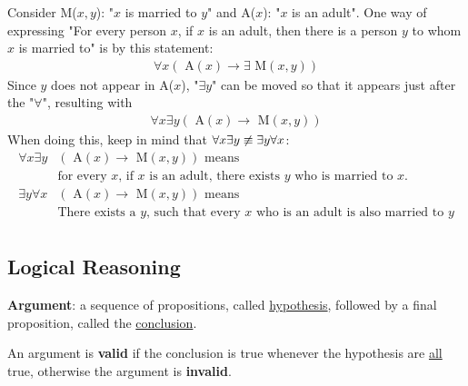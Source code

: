 \documentclass{article}
\begin{document}
Consider M($x, y$): "$x$ is married to $y$" and A($x$): "$x$ is an adult".
One way of expressing "For every person $x$, if $x$ is an adult, then
there is a person $y$ to whom $x$ is married to" is by this statement:
\begin{align*}
  \forall x (\text{ A}(x) \rightarrow \exists \text{ M}(x, y))
\end{align*}
Since $y$ does not appear in A($x$), "\(\exists y\)" can be moved so that it appears
just after the "\(\forall\)", resulting with
\begin{align*}
  \forall x \exists y (\text{ A}(x) \rightarrow \text{ M}(x, y))
\end{align*}
When doing this, keep in mind that \(\forall x \exists y \centernot \equiv \exists y \forall x\):
\begin{align*}
  \forall x \exists y & (\text{ A}(x) \rightarrow \text{ M}(x, y)) \text{ means}                              \\
                      & \text{for every $x$, if $x$ is an adult, there exists $y$ who is married to $x$.}     \\
  \exists y \forall x & (\text{ A}(x) \rightarrow \text{ M}(x, y)) \text{ means}                              \\
                      & \text{There exists a $y$, such that every $x$ who is an adult is also married to $y$} \\
\end{align*}

\subsection{Logical Reasoning}

\textbf{Argument}: a sequence of propositions, called \underline{hypothesis}, followed
by a final proposition, called the \underline{conclusion}.

An argument is \textbf{valid} if the conclusion is true whenever the hypothesis
are \underline{all} true, otherwise the argument is \textbf{invalid}.
\end{document}
